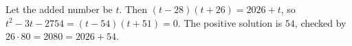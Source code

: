 Let the added number be $t$. Then $(t-28)(t+26)=2026+t$, so $t^2-3t-2754=(t-54)(t+51)=0$. The positive solution is $\boxed{54}$, checked by $26\cdot80=2080=2026+54$.
